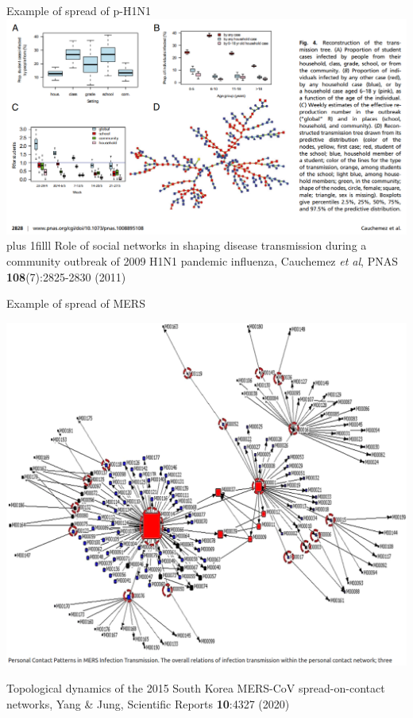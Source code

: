 \documentclass[aspectratio=169]{beamer}\usepackage[]{graphicx}\usepackage[]{xcolor}
\begin{document}
\begin{frame}{Example of spread of p-H1N1}
	\bigskip
	{\centering
		\hspace*{-\beamerleftmargin}
		\includegraphics[height=0.75\paperheight]{FIGS_slides/Cauchemez_etal_H1N1}
	}
	\vskip0pt plus 1filll
	\tiny
	Role of social networks in shaping disease transmission during a community outbreak of 2009 H1N1 pandemic influenza, Cauchemez \emph{et al}, PNAS \textbf{108}(7):2825-2830 (2011)
\end{frame}

\begin{frame}{Example of spread of MERS}
	\begin{minipage}{0.7\textwidth}
		\hspace*{-\beamerleftmargin}
		\includegraphics[height=\paperheight]{FIGS_slides/YangJung2015SouthKoreaMERS}
	\end{minipage}
	\begin{minipage}{0.18\textwidth}
	\tiny
	Topological dynamics of the 2015 South Korea MERS-CoV spread-on-contact networks, Yang \& Jung, Scientific Reports \textbf{10}:4327 (2020)
	\end{minipage}
\end{frame}
\end{document}

